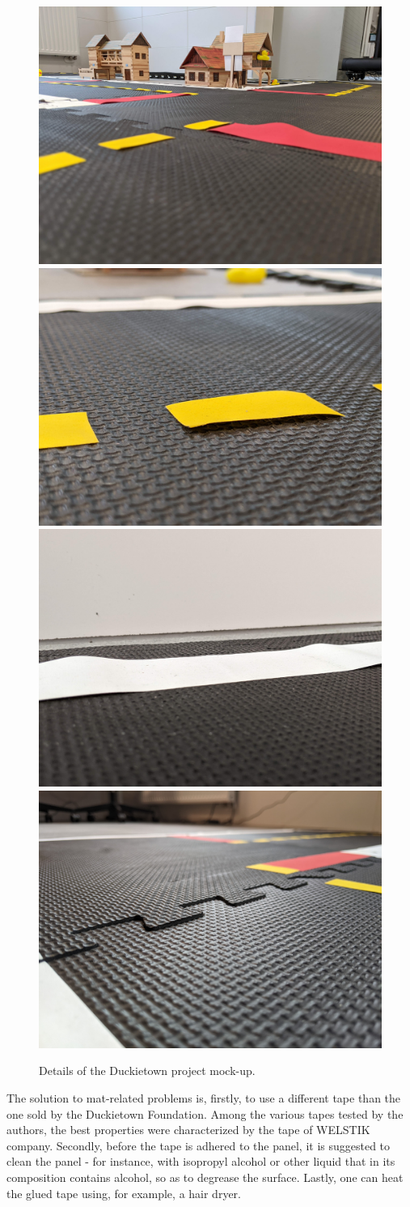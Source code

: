\documentclass[conference]{IEEEtran}
\begin{document}
\begin{figure}[ht!]
    \centering
    \includegraphics[width=.475\columnwidth]{floor-1.jpg}
    \includegraphics[width=.475\columnwidth]{floor-2.jpg}
    \\
    \includegraphics[width=.475\columnwidth]{floor-3.jpg}
    \includegraphics[width=.475\columnwidth]{floor-4.jpg}
    \caption{Details of the Duckietown project mock-up.}
    \label{fig:smart-city-plan-1}
\end{figure}

The solution to mat-related problems is, firstly, to use a different tape than the one sold by the Duckietown Foundation. Among the various tapes tested by the authors, the best properties were characterized by the tape of WELSTIK company. Secondly, before the tape is adhered to the panel, it is suggested to clean the panel - for instance, with isopropyl alcohol or other liquid that in its composition contains alcohol, so as to degrease the surface. Lastly, one can heat the glued tape using, for example, a hair dryer.
\end{document}
